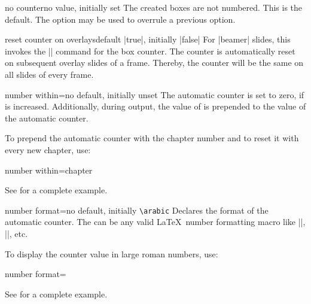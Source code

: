 \begin{newTcbKey}{no counter}{}{no value, initially set}
The created boxes are not numbered. This is the default. The option may
be used to overrule a previous option.
\end{newTcbKey}


\begin{newTcbKey}[][doc new=2019-10-18]{reset counter on overlays}{}{default |true|, initially |false|}
For |beamer| slides, this invokes the |\resetcounteronoverlays| command
for the box counter. The counter is automatically reset on subsequent
overlay slides of a frame.
Thereby, the counter will be the same on all slides of every frame.
\end{newTcbKey}


\clearpage
\begin{newTcbKey}{number within}{=}{no default, initially unset}
The automatic counter is set to zero, if  is increased.
Additionally, during output, the value of  is prepended to the value of
the automatic counter.\par
To prepend the automatic counter with the chapter number and to reset it
with every new chapter, use:
\begin{dispListing}
number within=chapter
\end{dispListing}
See  for a complete example.
\end{newTcbKey}


\begin{newTcbKey}{number format}{=}{no default, initially \texttt{\textbackslash arabic}}
Declares the format of the automatic counter. The  can be
any valid \LaTeX\ number formatting macro like |\arabic|, |\roman|, etc.\par
To display the counter value in large roman numbers, use:
\begin{dispListing}
number format=\Roman
\end{dispListing}
See  for a complete example.
\end{newTcbKey}


